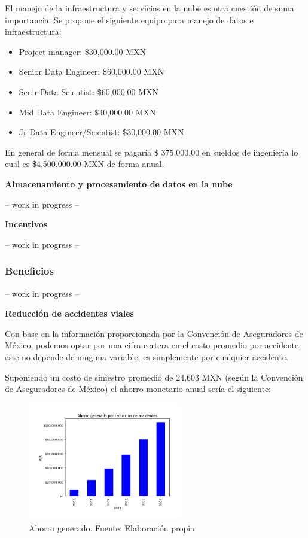 \documentclass{article}
\begin{document}
El manejo de la infraestructura y servicios en la nube es otra cuestión de suma importancia. Se propone el siguiente equipo para manejo de datos e infraestructura: 
\begin{itemize}
\item Project manager: \$30,000.00 MXN
\item Senior Data Engineer: \$60,000.00 MXN
\item Senir Data Scientist: \$60,000.00 MXN
\item Mid Data Engineer: \$40,000.00 MXN
\item Jr Data Engineer/Scientist: \$30,000.00 MXN
\end{itemize}

En general de forma mensual se pagaría \$ 375,000.00 en sueldos de ingeniería lo cual es \$4,500,000.00 MXN de forma anual. 

\textbf{Almacenamiento y procesamiento de datos en la nube}

-- work in progress --

\textbf{Incentivos}

-- work in progress --


\subsubsection{Beneficios}

-- work in progress --

\textbf{Reducción de accidentes viales}

Con base en la información proporcionada por la Convención de Aseguradores de México, podemos optar por una cifra certera en el costo promedio por accidente, este no depende de ninguna variable, es simplemente por cualquier accidente.

Suponiendo un costo de siniestro promedio de 24,603 MXN (según la Convención de Aseguradores de México) el ahorro
monetario anual sería el siguiente:

	\begin{figure}[H]\centering
	\includegraphics[width=0.6\textwidth]{resources/img/accident_savings.png}
	\caption{\label{fig:accident_savings} Ahorro generado. Fuente: Elaboración propia}
    \end{figure}
\end{document}
